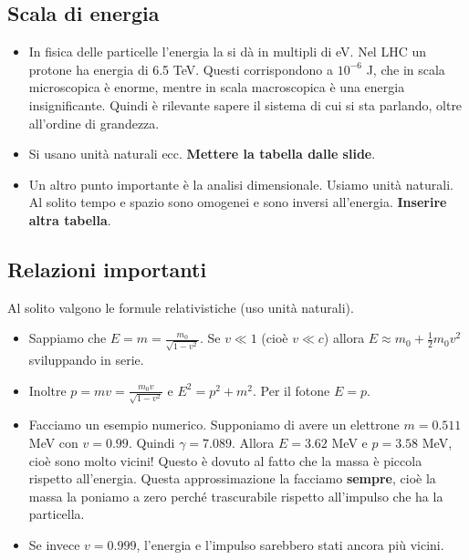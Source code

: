 \subsection{Scala di energia}
\begin{itemize}
    \item In fisica delle particelle l'energia la si dà in multipli di eV. Nel LHC un protone ha energia di 6.5 TeV. Questi corrispondono a $10^{-6}$ J, che in scala microscopica è enorme, mentre in scala macroscopica è una energia insignificante. Quindi è rilevante sapere il sistema di cui si sta parlando, oltre all'ordine di grandezza.
    \item Si usano unità naturali ecc. \textbf{Mettere la tabella dalle slide}.
    \item Un altro punto importante è la analisi dimensionale. Usiamo unità naturali. Al solito tempo e spazio sono omogenei e sono inversi all'energia. \textbf{Inserire altra tabella}.
\end{itemize}
\subsection{Relazioni importanti}
Al solito valgono le formule relativistiche (uso unità naturali).
\begin{itemize}
    \item Sappiamo che $E=m=\frac{m_0}{\sqrt{1-v^2}}$. Se $v\ll 1$ (cioè $v\ll c$) allora $E\approx m_0+\frac12 m_0v^2$ sviluppando in serie.
    \item Inoltre $p=mv=\frac{m_0v}{\sqrt{1-v^2}}$ e $E^2=p^2+m^2$. Per il fotone $E=p$.
    \item Facciamo un esempio numerico. Supponiamo di avere un elettrone $m=0.511$ MeV con $v=0.99$. Quindi $\gamma = 7.089$. Allora $E=3.62$ MeV e $p=3.58$ MeV, cioè sono molto vicini! Questo è dovuto al fatto che la massa è piccola rispetto all'energia. Questa approssimazione la facciamo \textbf{sempre}, cioè la massa la poniamo a zero perché trascurabile rispetto all'impulso che ha la particella. 
    \item Se invece $v=0.999$, l'energia e l'impulso sarebbero stati ancora più vicini.
\end{itemize}
